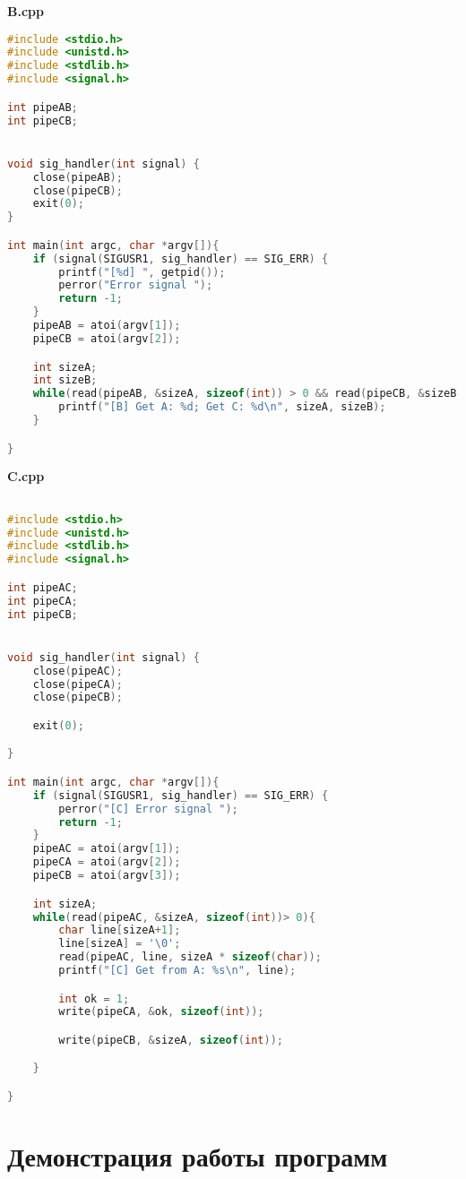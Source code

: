 \documentclass[pdf, unicode, 12pt, a4paper,oneside,fleqn]{article}
\begin{document}
{\large\textbf{B.cpp}}

\begin{lstlisting}[language=C++]
#include <stdio.h>
#include <unistd.h>
#include <stdlib.h>
#include <signal.h>

int pipeAB;
int pipeCB;


void sig_handler(int signal) {
    close(pipeAB);
    close(pipeCB);
    exit(0);
}

int main(int argc, char *argv[]){
    if (signal(SIGUSR1, sig_handler) == SIG_ERR) {
        printf("[%d] ", getpid());
        perror("Error signal ");
        return -1;
    }
    pipeAB = atoi(argv[1]);
    pipeCB = atoi(argv[2]);

    int sizeA;
    int sizeB;
    while(read(pipeAB, &sizeA, sizeof(int)) > 0 && read(pipeCB, &sizeB, sizeof(int)) > 0){
        printf("[B] Get A: %d; Get C: %d\n", sizeA, sizeB);
    }

}
\end{lstlisting}

{\large\textbf{C.cpp}}

\begin{lstlisting}[language=C++]

#include <stdio.h>
#include <unistd.h>
#include <stdlib.h>
#include <signal.h>

int pipeAC;
int pipeCA;
int pipeCB;


void sig_handler(int signal) {
    close(pipeAC);
    close(pipeCA);
    close(pipeCB);

    exit(0);

}

int main(int argc, char *argv[]){
    if (signal(SIGUSR1, sig_handler) == SIG_ERR) {
        perror("[C] Error signal ");
        return -1;
    }
    pipeAC = atoi(argv[1]);
    pipeCA = atoi(argv[2]);
    pipeCB = atoi(argv[3]);

    int sizeA;
    while(read(pipeAC, &sizeA, sizeof(int))> 0){
        char line[sizeA+1];
        line[sizeA] = '\0';
        read(pipeAC, line, sizeA * sizeof(char));
        printf("[C] Get from A: %s\n", line);

        int ok = 1;
        write(pipeCA, &ok, sizeof(int));

        write(pipeCB, &sizeA, sizeof(int));

    }

}
\end{lstlisting}

\section{Демонстрация работы программ}
\end{document}
